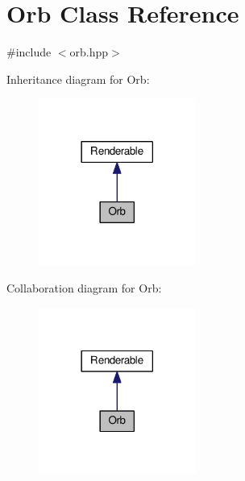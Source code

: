 \hypertarget{class_orb}{}\section{Orb Class Reference}
\label{class_orb}


{\ttfamily \#include $<$orb.\+hpp$>$}



Inheritance diagram for Orb\+:\nopagebreak
\begin{figure}[H]
\begin{center}
\leavevmode
\includegraphics[width=146pt]{class_orb__inherit__graph}
\end{center}
\end{figure}


Collaboration diagram for Orb\+:\nopagebreak
\begin{figure}[H]
\begin{center}
\leavevmode
\includegraphics[width=146pt]{class_orb__coll__graph}
\end{center}
\end{figure}
